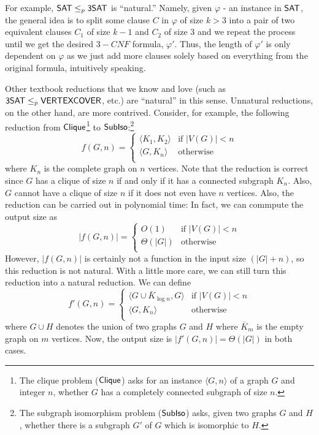 \documentclass[11pt]{article}
\begin{document}
	For example, $\mathsf{SAT} \leq_p \mathsf{3SAT}$ is ``natural.'' Namely, given $\varphi$ - an instance in $\mathsf{SAT}$, the general idea is to split some clause $C$ in $\varphi$ of size $k > 3$ into a pair of two equivalent clauses $C_1$ of size $k - 1$ and $C_2$ of size $3$ and we repeat the process until we get the desired $3-CNF$ formula, $\varphi'$. Thus, the length of $\varphi'$ is only dependent on $\varphi$ as we just add more clauses solely based on everything from the original formula, intuitively speaking.
	
	Other textbook reductions that we know and love (such as $\mathsf{3SAT} \leq_p \mathsf{VERTEXCOVER}$, etc.) are ``natural'' in this sense.
Unnatural reductions, on the other hand, are more contrived.
Consider, for example, the following reduction from
$\mathsf{Clique}$\footnote{
  The clique problem ($\mathsf{Clique}$) asks for an instance
  $\langle G, n \rangle$ of a graph $G$ and integer $n$, whether $G$ has
  a completely connected subgraph of size $n$.
}
to
$\mathsf{SubIso}$:\footnote{
  The subgraph isomorphism problem ($\mathsf{SubIso}$) asks, given two graphs
  $G$ and $H$, whether there is a subgraph $G'$ of $G$ which is isomorphic to
  $H$.
}
\[
  f(G, n) =
  \left\{
    \begin{array}{ll}
      \langle K_1, K_2 \rangle & \textrm{if } |V(G)| < n \\
      \langle G, K_{n} \rangle & \textrm{otherwise} \\
    \end{array}
  \right.
\]
where $K_n$ is the complete graph on $n$ vertices.
Note that the reduction is correct since $G$ has a clique of size $n$ if and
only if it has a connected subgraph $K_n$. Also, $G$ cannot have a clique of
size $n$ if it does not even have $n$ vertices.
Also, the reduction can be carried out in polynomial time: In fact,
we can commpute the output size as
\[
  |f(G,n)| = 
  \left\{
    \begin{array}{ll}
      O(1) & \textrm{if } |V(G)| < n \\
      \Theta(|G|) & \textrm{otherwise} \\
    \end{array}
  \right.
\]
However, $|f(G,n)|$ is certainly not a function in the input size $(|G|+n)$,
so this reduction is not natural.
%
With a little more care, we can still turn this reduction into a natural
reduction. We can define
\[
  f'(G, n) =
  \left\{
    \begin{array}{ll}
      \langle G \cup \bar K_{\log n}, G \rangle & \textrm{if } |V(G)| < n \\
      \langle G, K_{n} \rangle & \textrm{otherwise} \\
    \end{array}
  \right.
\]
where $G \cup H$ denotes the union of two graphs $G$ and $H$ where
$\bar K_m$ is the empty graph on $m$ vertices.
Now, the output size is $|f'(G,n)| = \Theta(|G|)$ in both cases.
\end{document}
